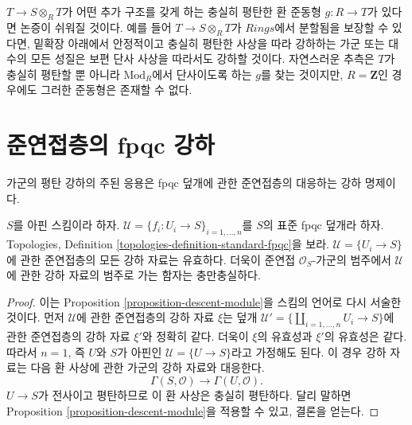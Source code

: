 \begin{remark}
\label{remark-when-locally-split}
$T \to S \otimes_R T$가 어떤 추가 구조를 갖게 하는 충실히 평탄한 환
준동형 $g: R \to T$가 있다면 논증이 쉬워질 것이다. 예를 들어
$T \to S \otimes_R T$가 $\textit{Rings}$에서 분할됨을 보장할 수 있다면,
밑확장 아래에서 안정적이고 충실히 평탄한 사상을 따라 강하하는 가군 또는
대수의 모든 성질은 보편 단사 사상을 따라서도 강하할 것이다. 자연스러운
추측은 $T$가 충실히 평탄할 뿐 아니라 $\text{Mod}_R$에서 단사이도록 하는
$g$를 찾는 것이지만, $R = \mathbf{Z}$인 경우에도 그러한 준동형은 존재할
수 없다.
\end{remark}
















\section{준연접층의 fpqc 강하}
\label{section-fpqc-descent-quasi-coherent}

\noindent
가군의 평탄 강하의 주된 응용은 fpqc 덮개에 관한 준연접층의 대응하는
강하 명제이다.

\begin{lemma}
\label{lemma-standard-fpqc-covering}
$S$를 아핀 스킴이라 하자.
$\mathcal{U} = \{f_i : U_i \to S\}_{i = 1, \ldots, n}$를 $S$의 표준 fpqc
덮개라 하자. Topologies, Definition
\ref{topologies-definition-standard-fpqc}을 보라.
$\mathcal{U} = \{U_i \to S\}$에 관한 준연접층의 모든 강하 자료는
유효하다. 더욱이 준연접 $\mathcal{O}_S$-가군의 범주에서
$\mathcal{U}$에 관한 강하 자료의 범주로 가는 함자는 충만충실하다.
\end{lemma}

\begin{proof}
이는 Proposition \ref{proposition-descent-module}을 스킴의 언어로 다시
서술한 것이다. 먼저 $\mathcal{U}$에 관한 준연접층의 강하 자료 $\xi$는
덮개 $\mathcal{U}' = \{\coprod_{i = 1, \ldots, n} U_i \to S\}$에 관한
준연접층의 강하 자료 $\xi'$와 정확히 같다. 더욱이 $\xi$의 유효성과
$\xi'$의 유효성은 같다. 따라서 $n = 1$, 즉 $U$와 $S$가 아핀인
$\mathcal{U} = \{U \to S\}$라고 가정해도 된다. 이 경우 강하 자료는
다음 환 사상에 관한 가군의 강하 자료와 대응한다.
$$
\Gamma(S, \mathcal{O})
\longrightarrow
\Gamma(U, \mathcal{O}).
$$
$U \to S$가 전사이고 평탄하므로 이 환 사상은 충실히 평탄하다. 달리
말하면 Proposition \ref{proposition-descent-module}을 적용할 수 있고,
결론을 얻는다.
\end{proof}


